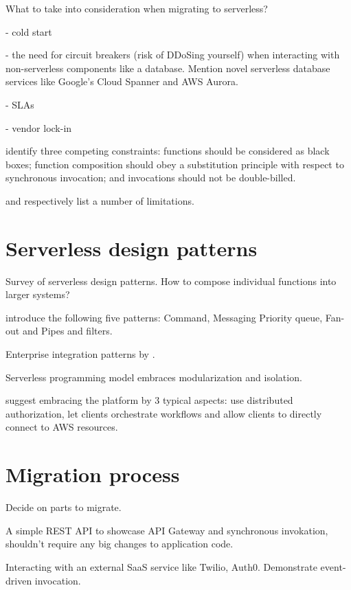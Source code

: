 \documentclass[utf8,english]{gradu3}
\begin{document}
What to take into consideration when migrating to serverless?

- cold start \parencite{lloydserverless}

- the need for circuit breakers (risk of DDoSing yourself) when interacting with non-serverless components like a database. Mention novel serverless database services like Google's Cloud Spanner and AWS Aurora.

- SLAs

- vendor lock-in

\textcite{baldini17trilemma} identify three competing constraints: functions should be considered as black boxes; function composition should obey a substitution principle with respect to synchronous invocation; and invocations should not be double-billed.

\textcite{robert2016serverlessarchitectures} and \textcite{adzic2017serverless} respectively list a number of limitations.

\chapter{Serverless design patterns}

Survey of serverless design patterns. How to compose individual functions into larger systems?

\textcite{sbarski2017serverless} introduce the following five patterns: Command, Messaging Priority queue, Fan-out and Pipes and filters.

Enterprise integration patterns by \textcite{hohpe2004enterprise}.

Serverless programming model embraces modularization and isolation.

\textcite{adzic2017serverless} suggest embracing the platform by 3 typical aspects: use distributed authorization, let clients orchestrate workflows and allow clients to directly connect to AWS resources.

\chapter{Migration process}

Decide on parts to migrate.

A simple REST API to showcase API Gateway and synchronous invokation, shouldn't require any big changes to application code.

Interacting with an external SaaS service like Twilio, Auth0. Demonstrate event-driven invocation.
\end{document}
